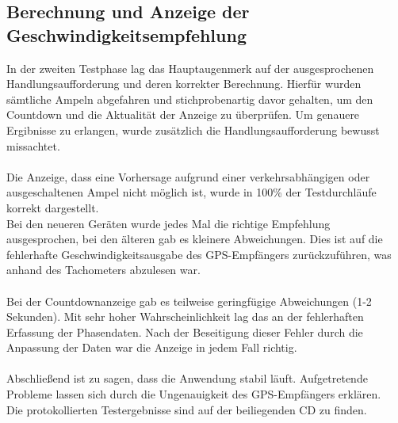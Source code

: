 \subsection{Berechnung und Anzeige der Geschwindigkeitsempfehlung}
In der zweiten Testphase lag das Hauptaugenmerk auf der ausgesprochenen Handlungsaufforderung und deren korrekter Berechnung. Hierfür wurden sämtliche Ampeln abgefahren und stichprobenartig davor gehalten, um den Countdown und die Aktualität der Anzeige zu überprüfen. Um genauere Ergibnisse zu erlangen, wurde zusätzlich die Handlungsaufforderung bewusst missachtet.\\\\  
Die Anzeige, dass eine Vorhersage aufgrund einer verkehrsabhängigen oder ausgeschaltenen Ampel nicht möglich ist, wurde in 100\% der Testdurchläufe korrekt dargestellt.\\ 
Bei den neueren Geräten wurde jedes Mal die richtige Empfehlung ausgesprochen, bei den älteren gab es kleinere Abweichungen. Dies ist auf die fehlerhafte Geschwindigkeitsausgabe des \gls{GPS}-Empfängers zurückzuführen, was anhand des Tachometers abzulesen war. \\\\
Bei der Countdownanzeige gab es teilweise geringfügige Abweichungen (1-2 Sekunden). Mit sehr hoher Wahrscheinlichkeit lag das an der fehlerhaften Erfassung der Phasendaten. Nach der Beseitigung dieser Fehler durch die Anpassung der Daten war die Anzeige in jedem Fall richtig.\\\\

Abschließend ist zu sagen, dass die Anwendung stabil läuft. Aufgetretende Probleme lassen sich durch die Ungenauigkeit des \gls{GPS}-Empfängers erklären.\\
Die protokollierten Testergebnisse sind auf der beiliegenden CD zu finden.
